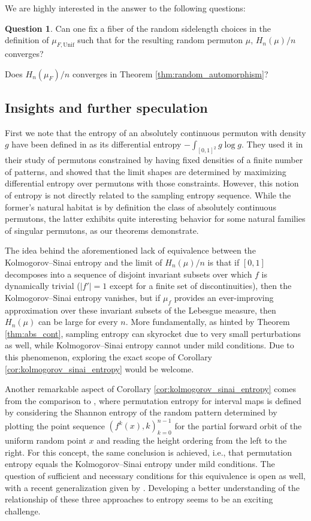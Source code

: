 \documentclass[11pt]{article}
\newcommand{\Unif}{\mathrm{Unif}}
\theoremstyle{definition}
\newtheorem{quest}[theorem]{Question}
\begin{document}
We are highly interested in the answer to the following questions:

\begin{quest}
    Can one fix a fiber of the random sidelength choices in the definition of $\mu_{F, \Unif}$ such that for the resulting random permuton $\mu$, $H_n(\mu)/n$ converges?

    Does $H_n(\mu_F)/n$ converges in Theorem \ref{thm:random_automorphism}?
\end{quest}


\subsection{Insights and further speculation}

First we note that the entropy of an absolutely continuous permuton with density $g$ have been defined in \cite{Kenyon2019} as its differential entropy $-\int_{[0, 1]^2} g\log g$. They used it in their study of permutons constrained by having fixed densities of a finite number of patterns, and showed that the limit shapes are determined by maximizing differential entropy over permutons with those constraints. However, this notion of entropy is not directly related to the sampling entropy sequence. While the former's natural habitat is by definition the class of absolutely continuous permutons, the latter exhibits quite interesting behavior for some natural families of singular permutons, as our theorems demonstrate.

The idea behind the aforementioned lack of equivalence between the Kolmogorov--Sinai entropy and the limit of $H_n(\mu)/n$ is that if $[0,1]$ decomposes into a sequence of disjoint invariant subsets over which $f$ is dynamically trivial ($|f'|=1$ except for a finite set of discontinuities), then the Kolmogorov--Sinai entropy vanishes, but if $\mu_f$ provides an ever-improving approximation over these invariant subsets of the Lebesgue measure, then $H_n(\mu)$ can be large for every $n$. More fundamentally, as hinted by Theorem \ref{thm:abs_cont}, sampling entropy can skyrocket due to very small perturbations as well, while Kolmogorov--Sinai entropy cannot under mild conditions. Due to this phenomenon, exploring the exact scope of Corollary \ref{cor:kolmogorov_sinai_entropy} would be welcome.

Another remarkable aspect of Corollary \ref{cor:kolmogorov_sinai_entropy} comes from the comparison to \cite{BandtKellerPompe}, where permutation entropy for interval maps is defined by considering the Shannon entropy of the random pattern determined by plotting the point sequence $(f^k(x), k)_{k=0}^{n-1}$ for the partial forward orbit of the uniform random point $x$ and reading the height ordering from the left to the right. For this concept, the same conclusion is achieved, i.e., that permutation entropy equals the Kolmogorov--Sinai entropy under mild conditions. The question of sufficient and necessary conditions for this equivalence is open as well, with a recent generalization given by \cite{GutjahrKeller}. Developing a better understanding of the relationship of these three approaches to entropy seems to be an exciting challenge.
\end{document}
